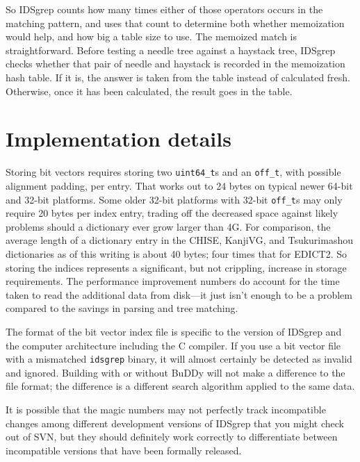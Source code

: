 \documentclass[twocolumn]{report}
\newcommand{\DangerousSection}{\marginpar{\large\hfill
\raisebox{-0.5\baselineskip}[0pt][0pt]{\dbend}\hfill\null}}
\begin{document}
So IDSgrep counts how many times either of those operators occurs in the
matching pattern, and uses that count to determine both whether memoization
would help, and how big a table size to use.  The memoized match is
straightforward.  Before testing a needle tree against a haystack tree,
IDSgrep checks whether that pair of needle and haystack is recorded in the
memoization hash table.  If it is, the answer is taken from the table
instead of calculated fresh.  Otherwise, once it has been calculated, the
result goes in the table.


\section{Implementation details}\DangerousSection

Storing bit vectors requires storing two \texttt{uint64\_t}s and an
\texttt{off\_t}, with possible alignment padding, per entry.  That works out
to 24 bytes on typical newer 64-bit and 32-bit platforms.  Some older 32-bit
platforms with 32-bit \texttt{off\_t}s may only require 20 bytes per index
entry, trading off the decreased space against likely problems should a
dictionary ever grow larger than 4G.  For comparison, the average length of
a dictionary entry in the CHISE, KanjiVG, and Tsukurimashou dictionaries as
of this writing is about 40 bytes; four times that for EDICT2.  So storing
the indices represents a significant, but not crippling, increase in storage
requirements.  The performance improvement numbers do account for the time
taken to read the additional data from disk---it just isn't enough to be a
problem compared to the savings in parsing and tree matching.

The format of the bit vector index file is specific to the version of
IDSgrep and the computer architecture including the C compiler.  If you use
a bit vector file with a mismatched \texttt{idsgrep} binary, it will almost
certainly be detected as invalid and ignored.  Building with or without
BuDDy will not make a difference to the file format; the difference is a
different search algorithm applied to the same data.

It is possible that the magic numbers may not
perfectly track incompatible changes among different development versions
of IDSgrep that you might check out of SVN, but they should definitely work
correctly to differentiate between incompatible versions that have been
formally released.
\end{document}

